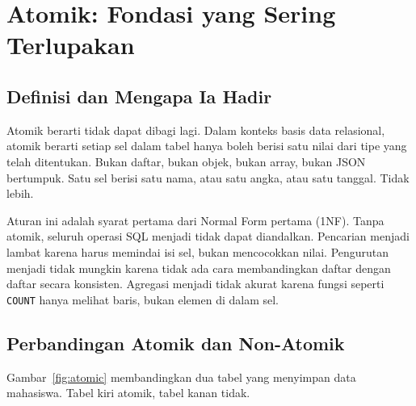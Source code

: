 \documentclass[11pt,a4paper]{article}
\begin{document}
\section{Atomik: Fondasi yang Sering Terlupakan}

\subsection{Definisi dan Mengapa Ia Hadir}

Atomik berarti tidak dapat dibagi lagi. Dalam konteks basis data relasional, atomik berarti setiap sel dalam tabel hanya boleh berisi satu nilai dari tipe yang telah ditentukan. Bukan daftar, bukan objek, bukan array, bukan JSON bertumpuk. Satu sel berisi satu nama, atau satu angka, atau satu tanggal. Tidak lebih.

Aturan ini adalah syarat pertama dari Normal Form pertama (1NF). Tanpa atomik, seluruh operasi SQL menjadi tidak dapat diandalkan. Pencarian menjadi lambat karena harus memindai isi sel, bukan mencocokkan nilai. Pengurutan menjadi tidak mungkin karena tidak ada cara membandingkan daftar dengan daftar secara konsisten. Agregasi menjadi tidak akurat karena fungsi seperti \texttt{COUNT} hanya melihat baris, bukan elemen di dalam sel.

\subsection{Perbandingan Atomik dan Non-Atomik}

Gambar~\ref{fig:atomic} membandingkan dua tabel yang menyimpan data mahasiswa. Tabel kiri atomik, tabel kanan tidak.
\end{document}

